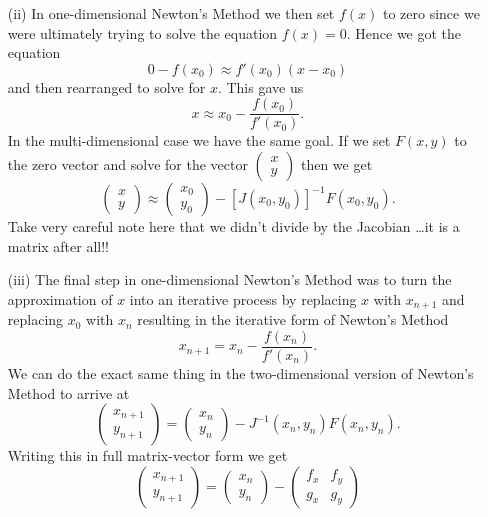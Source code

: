 \begin{problem}
\begin{enumerate}
\begin{enumerate}
    \item[(ii)] In one-dimensional Newton's Method we then set $f(x)$ to zero since we were
        ultimately trying to solve the equation $f(x) = 0$.  Hence we got the equation 
        \[ 0 - f(x_0) \approx f'(x_0)(x-x_0) \]
        and then rearranged to solve for $x$.  This gave us 
        \[ x \approx x_0 - \frac{f(x_0)}{f'(x_0)}. \]
        In the multi-dimensional case we have the same goal.  If we set $F(x,y)$ to the
        zero vector and solve for the vector $\begin{pmatrix}x\\y\end{pmatrix}$ then we
        get
        \[ \begin{pmatrix} x\\y\end{pmatrix} \approx \begin{pmatrix}
                x_0 \\ y_0 \end{pmatrix} -
            \left[ J(x_0,y_0) \right]^{-1} F(x_0,y_0). \]
        Take very careful note here that we didn't divide by the Jacobian \ldots it is a
        matrix after all!!
        \item[(iii)] The final step in one-dimensional Newton's Method was to turn the
            approximation of $x$ into an iterative process by replacing $x$ with $x_{n+1}$ and
            replacing $x_0$ with $x_{n}$ resulting in the iterative form of Newton's
            Method
            \[ x_{n+1} = x_{n} - \frac{f(x_n)}{f'(x_n)}. \]
            We can do the exact same thing in the two-dimensional version of Newton's
            Method to arrive at 
            \[ \boxed{ \begin{pmatrix} x_{n+1} \\ y_{n+1} \end{pmatrix} = \begin{pmatrix}
            x_n \\ y_n \end{pmatrix} - J^{-1}(x_n,y_n) F(x_n, y_n).} \]
        Writing this in full matrix-vector form we get
            \[ \boxed{ \begin{pmatrix} x_{n+1} \\ y_{n+1} \end{pmatrix} = \begin{pmatrix}
                x_n \\ y_n \end{pmatrix} - \begin{pmatrix} f_x & f_y \\ g_x & g_y

\end{pmatrix}}\]
\end{enumerate}
\end{enumerate}
\end{problem}
